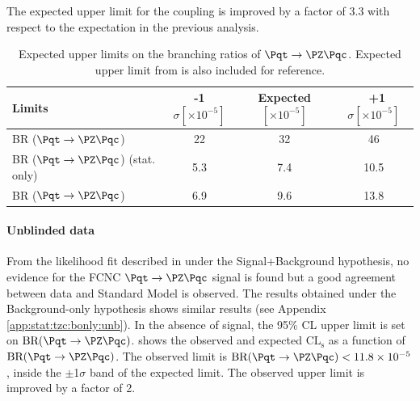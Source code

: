 The expected upper limit for the \tZc coupling is improved by a factor of 3.3 with respect to the expectation in the previous analysis.
\begin{table}[htbp]
	\centering
	\begin{tabular}{lccc} 
		\toprule
		\textbf{Limits} & \textbf{-1$\sigma [\times 10^{-5}]$} & \textbf{Expected  $[\times 10^{-5}]$} & \ \textbf{+1$\sigma [\times 10^{-5}]$}  \\
		\midrule
		BR ($\Pqt\rightarrow\PZ\Pqc$) \cite{TOPQ-2017-06} & 22 & 32& 46 \\
		BR ($\Pqt\rightarrow\PZ\Pqc$) (stat. only)                & 5.3 & 7.4 & 10.5 \\
		BR ($\Pqt\rightarrow\PZ\Pqc$)                                 & 6.9 & 9.6 & 13.8\\		
		\bottomrule
	\end{tabular}
	\caption{
		Expected upper limits on the branching ratios of $\Pqt\rightarrow\PZ\Pqc$.
		Expected upper limit from \cite{TOPQ-2017-06} is also included for reference.
	}%
	\label{tab:results:limits}
\end{table}
\newpage
\paragraph {Unblinded data}
From the likelihood fit described in  under the Signal+Background hypothesis, no evidence for the FCNC $\mathrm{\Pqt\rightarrow\PZ\Pqc}$ signal is found but a good agreement between data and Standard Model is observed. The results obtained under the Background-only hypothesis shows similar results (see Appendix \ref{app:stat:tzc:bonly:unb}).
In the absence of signal, the 95\% CL upper limit is set on $\mathrm{BR (\Pqt\rightarrow\PZ\Pqc)}$.
 shows the observed and expected $\mathrm{CL_{s}}$ as a function of $\mathrm{BR (\Pqt\rightarrow\PZ\Pqc)}$. The observed limit is $\mathrm{BR (\Pqt\rightarrow\PZ\Pqc)}<11.8\times 10^{-5}$, inside the $\pm$1$\sigma$ band of the expected limit.
The observed upper limit is improved by a factor of 2.

